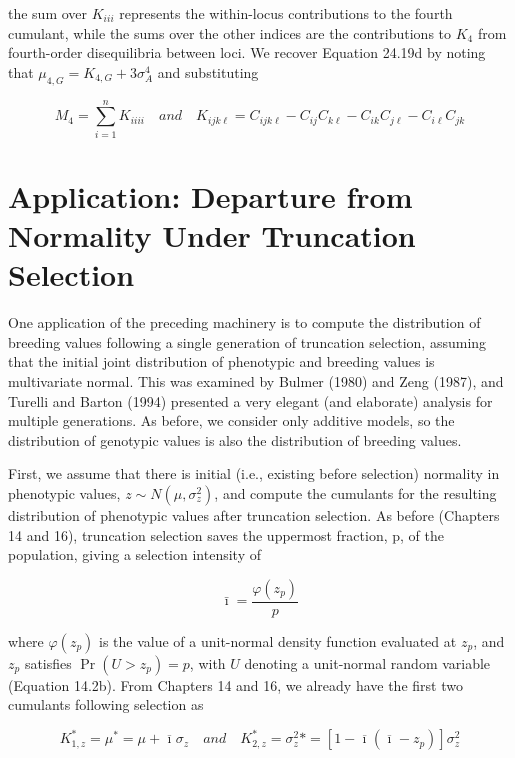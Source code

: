 \documentclass{article}
\begin{document}
the sum over  $ K_{iii} $ represents the within-locus contributions to the fourth cumulant, while the sums over the other indices are the contributions to  $ K_4 $ from fourth-order disequilibria between loci. We recover Equation 24.19d by noting that  $ \mu_{4,G} = K_{4,G} + 3\sigma_A^4 $ and substituting

\begin{equation}
M_{4}=\sum_{i=1}^{n}K_{iiii}\quad and\quad K_{ijk\ell}=C_{ijk\ell}-C_{ij}C_{k\ell}-C_{ik}C_{j\ell}-C_{i\ell}C_{jk}
\end{equation}

\section{Application: Departure from Normality Under Truncation Selection}
One application of the preceding machinery is to compute the distribution of breeding values following a single generation of truncation selection, assuming that the initial joint distribution of phenotypic and breeding values is multivariate normal. This was examined by Bulmer (1980) and Zeng (1987), and Turelli and Barton (1994) presented a very elegant (and elaborate) analysis for multiple generations. As before, we consider only additive models, so the distribution of genotypic values is also the distribution of breeding values.

First, we assume that there is initial (i.e., existing before selection) normality in phenotypic values,  $ z \sim N(\mu, \sigma_z^2) $, and compute the cumulants for the resulting distribution of phenotypic values after truncation selection. As before (Chapters 14 and 16), truncation selection saves the uppermost fraction, p, of the population, giving a selection intensity of

\begin{equation}
\bar{\imath}=\frac{\varphi(z_{p})}{p}
\end{equation}

where  $ \varphi(z_p) $ is the value of a unit-normal density function evaluated at  $ z_p $, and  $ z_p $ satisfies  $ \Pr(U > z_p) = p $, with  $ U $ denoting a unit-normal random variable (Equation 14.2b). From Chapters 14 and 16, we already have the first two cumulants following selection as

\begin{equation}
K_{1,z}^{*}=\mu^{*}=\mu+\overline{\imath}\sigma_{z}\quad and\quad K_{2,z}^{*}=\sigma_{z}^{2}*=[1-\overline{\imath}(\overline{\imath}-z_{p})]\sigma_{z}^{2}
\end{equation}
\end{document}
